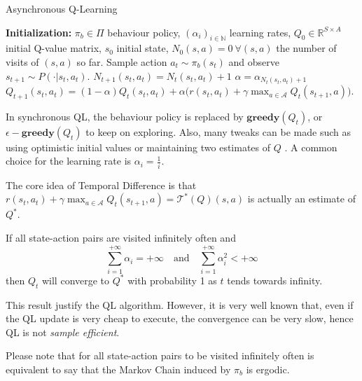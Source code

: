 \begin{algorithm}[htbp]
\small
\caption{Asynchronous Q-Learning}
\label{alg:QL}
\begin{algorithmic}
\State \textbf{Initialization:} $\pi_b \in \Pi$ behaviour policy, $(\alpha_i)_{i \in \mathbb{N}}$ learning rates, $Q_0 \in \mathbb{R}^{S \times A}$ initial Q-value matrix, $s_0$ initial state, $N_0(s,a) = 0 \ \forall (s,a)$ the number of visits of $(s,a)$ so far.
\State Sample action $a_t\sim \pi_b(s_t)$ and observe $s_{t+1}\sim P(\cdot\vert s_t,a_t)$.
\State $N_{t+1}(s_t,a_t)=N_t(s_t,a_t)+1$
\State $\alpha = \alpha_{N_t(s_t,a_t)+1}$
\State $Q_{t+1}(s_t,a_t)= (1-\alpha)Q_t(s_t,a_t)+\alpha\Big(r(s_t,a_t)+\gamma \max_{a\in\mathcal{A}}Q_t(s_{t+1},a)\Big)$.
\EndFor
\end{algorithmic}
\normalsize
\end{algorithm}

In synchronous QL, the behaviour policy is replaced by $\mathbf{greedy}(Q_t)$, or $\epsilon-\mathbf{greedy}(Q_t)$ to keep on exploring. Also, many tweaks can be made such as using optimistic initial values or maintaining two estimates of $Q$ \citep{even-dar_convergence_2001, hasselt2010double}. A common choice for the learning rate is $\alpha_i = \frac{1}{i}$.

The core idea of Temporal Difference is that $r(s_t,a_t)+\gamma \max_{a\in\mathcal{A}}Q_t(s_{t+1},a) = \mathcal{T}^*(Q)(s,a)$ is actually an estimate of $Q^*$.

\begin{thm}\label{thm:QL-conv}
  If all state-action pairs are visited infinitely often and $$\sum_{i=1}^{+\infty}\alpha_i = +\infty \quad\text{and}\quad \sum_{i=1}^{+\infty}\alpha_i^2 < +\infty$$ then $Q_t$ will converge to $Q^*$ with probability 1 as $t$ tends towards infinity.
\end{thm}

This result justify the QL algorithm. However, it is very well known that, even if the QL update is very cheap to execute, the convergence can be very slow, hence QL is not \emph{sample efficient}.

Please note that for all state-action pairs to be visited infinitely often is equivalent to say that the Markov Chain induced by $\pi_b$ is ergodic.
